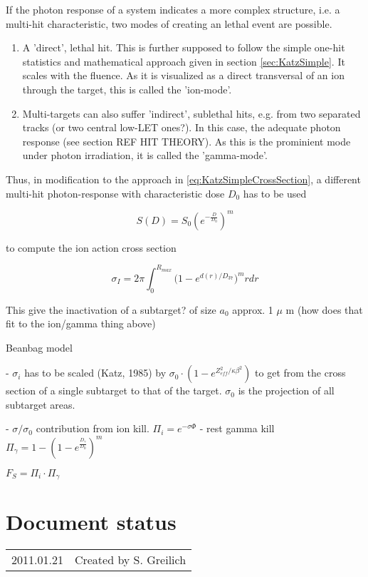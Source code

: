 If the photon response of a system indicates a more complex structure, i.e. a
multi-hit characteristic, two modes of creating an lethal event are possible.

\begin{enumerate}
  \item A 'direct', lethal hit. This is further supposed to follow the
  simple one-hit statistics and mathematical approach given in section
  \ref{sec:KatzSimple}. It scales with the fluence. As it is visualized as a
  direct transversal of an ion through the target, this is called the
  'ion-mode'.
  \item Multi-targets can also suffer 'indirect', sublethal hits, e.g. from two
  separated tracks (or two central low-LET ones?). In this case, the
  adequate photon response (see section REF HIT THEORY). As this is the
  prominient mode under photon irradiation, it is called the 'gamma-mode'.
\end{enumerate}

Thus, in modification to the approach in \ref{eq:KatzSimpleCrossSection}, a
different multi-hit photon-response with characteristic dose $D_0$ has to be
used 

\begin{equation}
S(D)=S_0 (e^{-\frac{D}{D_{0}}})^m
\end{equation}

to compute the ion action cross section

\begin{equation}
\label{eq:KatzSimpleCrossSection}
\sigma_I = 2\pi\int_{0}^{R_{max}}({1-e^{d(r)/D_{37}})^mrdr}
\end{equation}

This give the inactivation of a subtarget? of size $a_0$ approx. 1 $\mu$ m (how
does that fit to the ion/gamma thing above)

Beanbag model

- $\sigma_i$ has to be scaled (Katz, 1985) by
$\sigma_0\cdot(1-e^{Z_{eff}^2/\kappa\beta^2})$ to get from the cross section of
a single subtarget to that of the target. $\sigma_0$ is the projection of all
subtarget areas.

- $\sigma / \sigma_0$ contribution from ion kill. $\Pi_i=e^{-\sigma\Phi}$
- rest gamma kill $\Pi_\gamma=1-(1-e^\frac{D_\gamma}{D_0})^m$

$F_S = \Pi_i \cdot \Pi_\gamma$


\section*{Document status}
\begin{tabular}{l l}
2011.01.21&Created by S. Greilich
\end{tabular} 